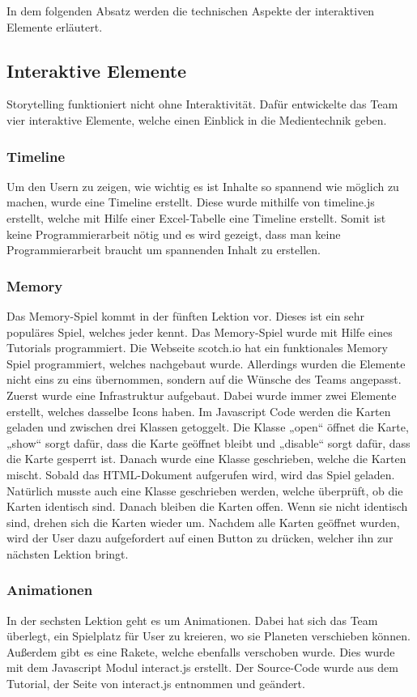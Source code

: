 In dem folgenden Absatz werden die technischen Aspekte der interaktiven Elemente erläutert.


\subsection{Interaktive Elemente}

Storytelling funktioniert nicht ohne Interaktivität.  Dafür entwickelte das Team vier interaktive Elemente, welche einen Einblick in die Medientechnik geben. 
\subsubsection{Timeline}
Um den Usern zu zeigen, wie wichtig es ist Inhalte so spannend wie möglich zu machen, wurde eine Timeline erstellt. Diese wurde mithilfe von timeline.js erstellt, welche mit Hilfe einer Excel-Tabelle eine Timeline erstellt. Somit ist keine Programmierarbeit nötig und es wird gezeigt, dass man keine Programmierarbeit braucht um spannenden Inhalt zu erstellen.
\subsubsection{Memory}
Das Memory-Spiel kommt in der fünften Lektion vor. Dieses ist ein sehr populäres Spiel, welches jeder kennt. Das Memory-Spiel wurde mit Hilfe eines Tutorials programmiert. Die Webseite scotch.io  hat ein funktionales Memory Spiel programmiert, welches nachgebaut wurde. Allerdings wurden die Elemente nicht eins zu eins übernommen, sondern auf die Wünsche des Teams angepasst. Zuerst wurde eine Infrastruktur aufgebaut. Dabei wurde immer zwei Elemente erstellt, welches dasselbe Icons haben. Im Javascript Code werden die Karten geladen und zwischen drei Klassen getoggelt. Die Klasse „open“ öffnet die Karte, „show“ sorgt dafür, dass die Karte geöffnet bleibt und „disable“ sorgt dafür, dass die Karte gesperrt ist. Danach wurde eine Klasse geschrieben, welche die Karten mischt. Sobald das HTML-Dokument aufgerufen wird, wird das Spiel geladen. Natürlich musste auch eine Klasse geschrieben werden, welche überprüft, ob die Karten identisch sind. Danach bleiben die Karten offen. Wenn sie nicht identisch sind, drehen sich die Karten wieder um. Nachdem alle Karten geöffnet wurden, wird der User dazu aufgefordert auf einen Button zu drücken, welcher ihn zur nächsten Lektion bringt. 

\subsubsection{Animationen}
In der sechsten Lektion geht es um Animationen. Dabei hat sich das Team überlegt, ein Spielplatz für User zu kreieren, wo sie Planeten verschieben können. Außerdem gibt es eine Rakete, welche ebenfalls verschoben wurde. Dies wurde mit dem Javascript Modul interact.js erstellt. Der Source-Code wurde aus dem Tutorial, der Seite von interact.js entnommen und geändert. 

